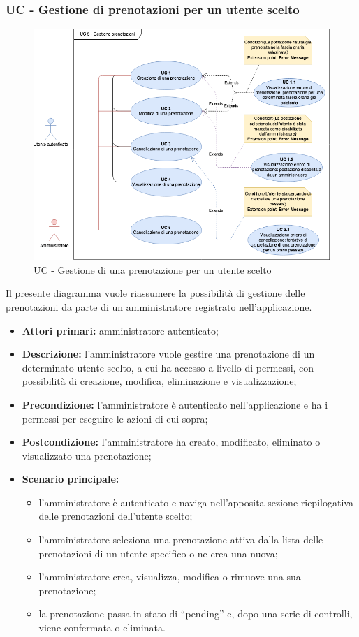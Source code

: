 \subsubsection{UC - Gestione di prenotazioni per un utente scelto}

\begin{figure}[h]
  \centering
    \includegraphics[scale=0.5]{src/CasiDUso/Immagini/UC5.png}
  \caption{UC  - Gestione di una prenotazione per un utente scelto}
\end{figure}

Il presente diagramma vuole riassumere la possibilità di gestione delle prenotazioni da parte di un amministratore registrato nell’applicazione.

\begin{itemize}
\item \textbf{Attori primari:} amministratore autenticato;
\item \textbf{Descrizione:} l'amministratore vuole gestire una prenotazione di un determinato utente scelto, a cui ha accesso a livello di permessi, con possibilità di creazione, modifica, eliminazione e visualizzazione;
\item \textbf{Precondizione:} l'amministratore è autenticato nell’applicazione e ha i permessi per eseguire le azioni di cui sopra;
\item \textbf{Postcondizione:} l'amministratore ha creato, modificato, eliminato o visualizzato una prenotazione;
\item \textbf{Scenario principale:} 
	\begin{itemize}
		\item l'amministratore è autenticato e naviga nell'apposita sezione riepilogativa delle prenotazioni dell'utente scelto;
		\item l'amministratore seleziona una prenotazione attiva dalla lista delle prenotazioni di un utente specifico o ne crea una nuova;
		\item l'amministratore crea, visualizza, modifica o rimuove una sua prenotazione;
		\item la prenotazione passa in stato di “pending” e, dopo una serie di controlli, viene confermata o eliminata.
	\end{itemize}
\end{itemize}

